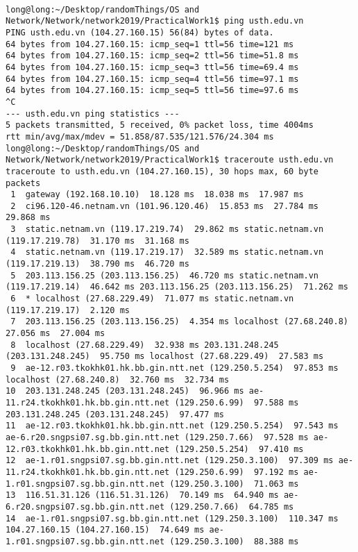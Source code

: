 \documentclass[12pt]{article}
\begin{document}
\maketitle
\begin{lstlisting}

long@long:~/Desktop/randomThings/OS and Network/Network/network2019/PracticalWork1$ ping usth.edu.vn
PING usth.edu.vn (104.27.160.15) 56(84) bytes of data.
64 bytes from 104.27.160.15: icmp_seq=1 ttl=56 time=121 ms
64 bytes from 104.27.160.15: icmp_seq=2 ttl=56 time=51.8 ms
64 bytes from 104.27.160.15: icmp_seq=3 ttl=56 time=69.4 ms
64 bytes from 104.27.160.15: icmp_seq=4 ttl=56 time=97.1 ms
64 bytes from 104.27.160.15: icmp_seq=5 ttl=56 time=97.6 ms
^C
--- usth.edu.vn ping statistics ---
5 packets transmitted, 5 received, 0% packet loss, time 4004ms
rtt min/avg/max/mdev = 51.858/87.535/121.576/24.304 ms
long@long:~/Desktop/randomThings/OS and Network/Network/network2019/PracticalWork1$ traceroute usth.edu.vn
traceroute to usth.edu.vn (104.27.160.15), 30 hops max, 60 byte packets
 1  gateway (192.168.10.10)  18.128 ms  18.038 ms  17.987 ms
 2  ci96.120-46.netnam.vn (101.96.120.46)  15.853 ms  27.784 ms  29.868 ms
 3  static.netnam.vn (119.17.219.74)  29.862 ms static.netnam.vn (119.17.219.78)  31.170 ms  31.168 ms
 4  static.netnam.vn (119.17.219.17)  32.589 ms static.netnam.vn (119.17.219.13)  38.790 ms  46.720 ms
 5  203.113.156.25 (203.113.156.25)  46.720 ms static.netnam.vn (119.17.219.14)  46.642 ms 203.113.156.25 (203.113.156.25)  71.262 ms
 6  * localhost (27.68.229.49)  71.077 ms static.netnam.vn (119.17.219.17)  2.120 ms
 7  203.113.156.25 (203.113.156.25)  4.354 ms localhost (27.68.240.8)  27.056 ms  27.004 ms
 8  localhost (27.68.229.49)  32.938 ms 203.131.248.245 (203.131.248.245)  95.750 ms localhost (27.68.229.49)  27.583 ms
 9  ae-12.r03.tkokhk01.hk.bb.gin.ntt.net (129.250.5.254)  97.853 ms localhost (27.68.240.8)  32.760 ms  32.734 ms
10  203.131.248.245 (203.131.248.245)  96.966 ms ae-11.r24.tkokhk01.hk.bb.gin.ntt.net (129.250.6.99)  97.588 ms 203.131.248.245 (203.131.248.245)  97.477 ms
11  ae-12.r03.tkokhk01.hk.bb.gin.ntt.net (129.250.5.254)  97.543 ms ae-6.r20.sngpsi07.sg.bb.gin.ntt.net (129.250.7.66)  97.528 ms ae-12.r03.tkokhk01.hk.bb.gin.ntt.net (129.250.5.254)  97.410 ms
12  ae-1.r01.sngpsi07.sg.bb.gin.ntt.net (129.250.3.100)  97.309 ms ae-11.r24.tkokhk01.hk.bb.gin.ntt.net (129.250.6.99)  97.192 ms ae-1.r01.sngpsi07.sg.bb.gin.ntt.net (129.250.3.100)  71.063 ms
13  116.51.31.126 (116.51.31.126)  70.149 ms  64.940 ms ae-6.r20.sngpsi07.sg.bb.gin.ntt.net (129.250.7.66)  64.785 ms
14  ae-1.r01.sngpsi07.sg.bb.gin.ntt.net (129.250.3.100)  110.347 ms 104.27.160.15 (104.27.160.15)  74.649 ms ae-1.r01.sngpsi07.sg.bb.gin.ntt.net (129.250.3.100)  88.388 ms

\end{lstlisting}
\end{document}
